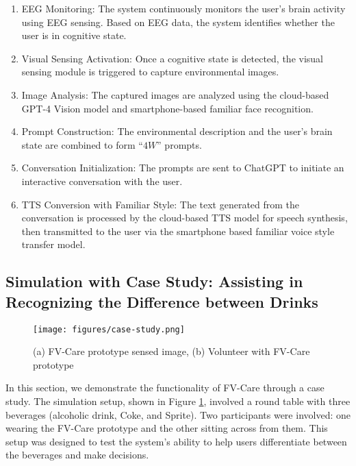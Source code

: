 \documentclass[conference]{IEEEtran}
\begin{document}
\begin{enumerate}
    \item EEG Monitoring: The system continuously monitors the user's brain activity using EEG sensing. Based on EEG data, the system identifies whether the user is in cognitive state.
    \item Visual Sensing Activation: Once a cognitive state is detected, the visual sensing module is triggered to capture environmental images.
    \item Image Analysis: The captured images are analyzed using the cloud-based GPT-4 Vision model and smartphone-based familiar face recognition.
    \item Prompt Construction: The environmental description and the user's brain state are combined to form ``$4W$'' prompts.
    \item Conversation Initialization: The prompts are sent to ChatGPT to initiate an interactive conversation with the user.
    \item TTS Conversion with Familiar Style: The text generated from the conversation is processed by the cloud-based TTS model for speech synthesis, then transmitted to the user via the smartphone based familiar voice style transfer model.

\end{enumerate}



\subsection{Simulation with Case Study: Assisting in Recognizing the Difference between Drinks}

\begin{figure}[!t]
    \centering
    \texttt{[image: figures/case-study.png]}%
    \caption{(a) FV-Care prototype sensed image, (b) Volunteer with FV-Care prototype}    
    \label{fig:case}
    \vspace{-0.5cm}
\end{figure}

In this section, we demonstrate the functionality of FV-Care through a case study.
The simulation setup, shown in Figure \ref{fig:case}, involved a round table with three beverages (alcoholic drink, Coke, and Sprite). Two participants were involved: one wearing the FV-Care prototype and the other sitting across from them. This setup was designed to test the system’s ability to help users differentiate between the beverages and make decisions.
\end{document}

